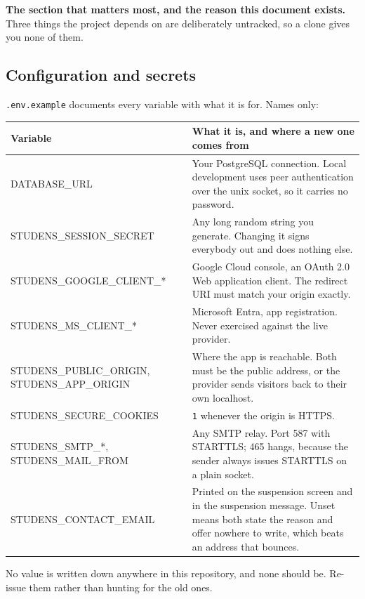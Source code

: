 \documentclass[11pt,a4paper]{article}
\begin{document}
\textbf{The section that matters most, and the reason this document exists.}
Three things the project depends on are deliberately untracked, so a clone
gives you none of them.

\subsection{Configuration and secrets}

\texttt{.env.example} documents every variable with what it is for. Names only:

\begin{center}
\sffamily\scriptsize
\begin{tabular}{@{}>{\ttfamily}p{4.6cm} p{9.6cm}@{}}
\toprule
\textrm{\textbf{Variable}} & \textrm{\textbf{What it is, and where a new one comes from}} \\
\midrule
DATABASE\_URL & Your PostgreSQL connection. Local development uses peer authentication over the unix socket, so it carries no password. \\
STUDENS\_SESSION\_SECRET & Any long random string you generate. Changing it signs everybody out and does nothing else. \\
STUDENS\_GOOGLE\_CLIENT\_* & Google Cloud console, an OAuth 2.0 Web application client. The redirect URI must match your origin exactly. \\
STUDENS\_MS\_CLIENT\_* & Microsoft Entra, app registration. Never exercised against the live provider. \\
STUDENS\_PUBLIC\_ORIGIN, \newline STUDENS\_APP\_ORIGIN & Where the app is reachable. Both must be the public address, or the provider sends visitors back to their own localhost. \\
STUDENS\_SECURE\_COOKIES & \texttt{1} whenever the origin is HTTPS. \\
STUDENS\_SMTP\_*, \newline STUDENS\_MAIL\_FROM & Any SMTP relay. Port 587 with STARTTLS; 465 hangs, because the sender always issues STARTTLS on a plain socket. \\
STUDENS\_CONTACT\_EMAIL & Printed on the suspension screen and in the suspension message. Unset means both state the reason and offer nowhere to write, which beats an address that bounces. \\
\bottomrule
\end{tabular}
\end{center}

\begin{careful}
No value is written down anywhere in this repository, and none should be.
Re-issue them rather than hunting for the old ones.
\end{careful}
\end{document}
